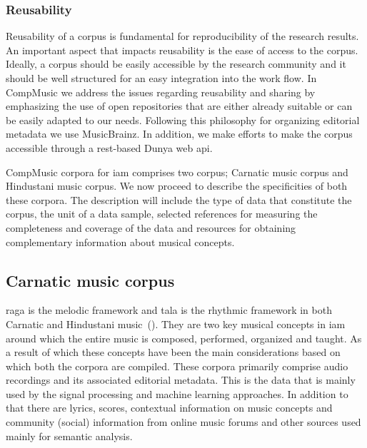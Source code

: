 \subsubsection{Reusability}

Reusability of a corpus is fundamental for reproducibility of the research results. An important aspect that impacts reusability is the ease of access to the corpus. Ideally, a corpus should be easily accessible by the research community and it should be well structured for an easy integration into the work flow. In CompMusic we address the issues regarding reusability and sharing by emphasizing the use of open repositories that are either already suitable or can be easily adapted to our needs. Following this philosophy for organizing editorial metadata we use MusicBrainz. In addition, we make efforts to make the corpus  accessible through a \acrshort{rest}-based Dunya web \gls{api}.

CompMusic corpora for \gls{iam} comprises two corpus; Carnatic music corpus and Hindustani music corpus. We now proceed to describe the specificities of both these corpora. The description will include the type of data that constitute the corpus, the unit of a data sample, selected references for measuring the completeness and coverage of the data and resources for obtaining complementary information about musical concepts. 


\subsection{Carnatic music corpus}
\label{sec:corpus_carnatic_music_corpus}


\Gls{raga} is the melodic framework and \gls{tala} is the rhythmic framework in both Carnatic and Hindustani music~(). They are two key musical concepts in \gls{iam} around which the entire music is composed, performed, organized and taught. As a result of which these concepts have been the main considerations based on which both the corpora are compiled. These corpora primarily comprise audio recordings and its associated editorial metadata. This is the data that is mainly used by the signal processing and machine learning approaches. In addition to that there are lyrics, scores, contextual information on music concepts and community (social) information from online music forums and other sources used mainly for semantic analysis.

